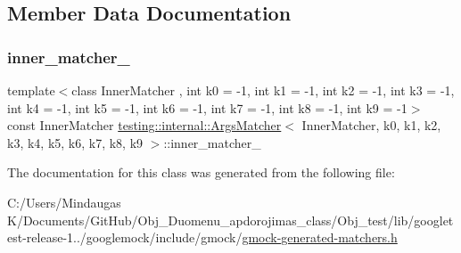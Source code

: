 \subsection{Member Data Documentation}
\mbox{\label{classtesting_1_1internal_1_1_args_matcher_ac76e55e4b52e18fa0c57aad4814a8a70}} 
\subsubsection{\texorpdfstring{inner\_matcher\_}{inner\_matcher\_}}
{\footnotesize\ttfamily template$<$class Inner\+Matcher , int k0 = -\/1, int k1 = -\/1, int k2 = -\/1, int k3 = -\/1, int k4 = -\/1, int k5 = -\/1, int k6 = -\/1, int k7 = -\/1, int k8 = -\/1, int k9 = -\/1$>$ \\
const Inner\+Matcher \mbox{\hyperlink{classtesting_1_1internal_1_1_args_matcher}{testing\+::internal\+::\+Args\+Matcher}}$<$ Inner\+Matcher, k0, k1, k2, k3, k4, k5, k6, k7, k8, k9 $>$\+::inner\+\_\+matcher\+\_\+\hspace{0.3cm}{\ttfamily [private]}}



The documentation for this class was generated from the following file\+:\begin{DoxyCompactItemize}
\item 
C\+:/\+Users/\+Mindaugas K/\+Documents/\+Git\+Hub/\+Obj\+\_\+\+Duomenu\+\_\+apdorojimas\+\_\+class/\+Obj\+\_\+test/lib/googletest-\/release-\/1../googlemock/include/gmock/\mbox{\hyperlink{_obj__test_2lib_2googletest-release-1_88_81_2googlemock_2include_2gmock_2gmock-generated-matchers_8h}{gmock-\/generated-\/matchers.\+h}}\end{DoxyCompactItemize}
